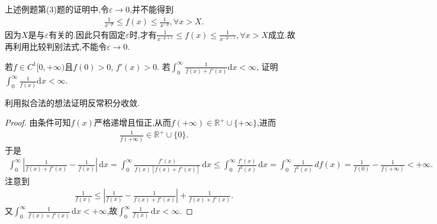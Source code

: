 \documentclass[../../main.tex]{subfiles}
\begin{document}
\begin{remark}
上述例题第(3)题的证明中,令$\varepsilon \to 0$,并不能得到
\begin{align*}
\frac{1}{x^{-p}}\leqslant f(x)\leqslant \frac{1}{x^{-p}},\forall x>X.
\end{align*}
因为$X$是与$\varepsilon$有关的.因此只有固定$\varepsilon$时,才有$\frac{1}{x^{-p+\varepsilon}}\leqslant f\left( x \right) \leqslant \frac{1}{x^{-p-\varepsilon}},\forall x>X$成立.故再利用比较判别法式,不能令$\varepsilon\to 0$.
\end{remark}

\begin{example}
若$f \in C^1[0, +\infty)$且$f(0) > 0$, $f'(x) > 0$. 若$\int_0^{\infty} \frac{1}{f(x) + f'(x)} \mathrm{d}x < \infty$, 证明$\int_0^{\infty} \frac{1}{f(x)} \mathrm{d}x < \infty$.
\end{example}
\begin{note}
利用拟合法的想法证明反常积分收敛.
\end{note}
\begin{proof}
由条件可知$f(x)$严格递增且恒正,从而$f(+\infty) \in \mathbb{R}^+ \cup \{+\infty\}$,进而
\begin{align*}
\frac{1}{f(+\infty)} \in \mathbb{R}^+ \cup \{0\}.
\end{align*}
于是
\begin{align*}
\int_0^{\infty} \left| \frac{1}{f(x) + f'(x)} - \frac{1}{f(x)} \right| \, \mathrm{d}x = \int_0^{\infty} \frac{f'(x)}{f(x) \left[ f(x) + f'(x) \right]} \, \mathrm{d}x \leqslant \int_0^{\infty} \frac{f'(x)}{f^2(x)} \, \mathrm{d}x = \int_0^{\infty} \frac{1}{f^2(x)} \, df(x) = \frac{1}{f(0)} - \frac{1}{f(+\infty)} < +\infty.
\end{align*}
注意到
\begin{align*}
\frac{1}{f(x)} \leqslant \left| \frac{1}{f(x)} - \frac{1}{f(x) + f'(x)} \right| + \frac{1}{f(x) + f'(x)}.
\end{align*}
又$\int_0^{\infty} \frac{1}{f(x) + f'(x)} \, \mathrm{d}x < +\infty$,故$\int_0^{\infty} \frac{1}{f(x)} \, \mathrm{d}x < \infty$.
\end{proof}
\end{document}
